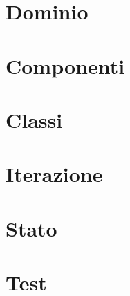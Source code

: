 \documentclass[12pt]{article}
\begin{document}
\section{Dominio}

\section{Componenti}

\section{Classi}

\section{Iterazione}

\section{Stato}

\section{Test}
\end{document}
